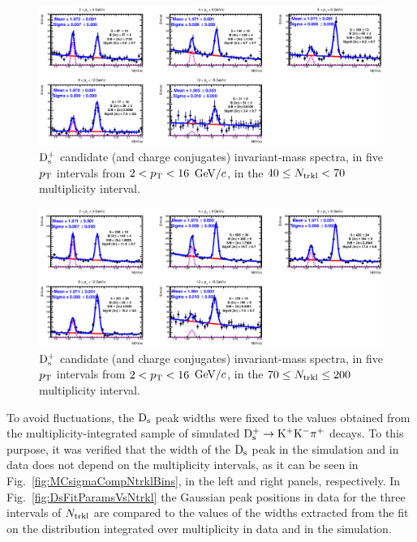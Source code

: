 \begin{figure}[htpb]
\centering
 \includegraphics[width=1\textwidth]{FigCap6/DsMass_4070Trkl.eps}
  \caption{${\rm D_s^+}$ candidate (and charge conjugates) invariant-mass spectra, in five $p_{\rm T}$ intervals from $2 < p_{\rm T} < 16$ $\mathrm{GeV}/c$, in the $40 \leq N_{\rm trkl} < 70$ multiplicity interval.}
 \label{fig:DsInvMassVsNtrkl_2}
\end{figure}
\begin{figure}[htpb]
\centering
 \includegraphics[width=1\textwidth]{FigCap6/DsMass_70200Trkl.eps}
  \caption{${\rm D_s^+}$ candidate (and charge conjugates) invariant-mass spectra, in five $p_{\rm T}$ intervals from $2 < p_{\rm T} < 16$ $\mathrm{GeV}/c$, in the $70 \leq N_{\rm trkl} \leq 200$ multiplicity interval.}
 \label{fig:DsInvMassVsNtrkl_3}
\end{figure}
To avoid fluctuations, the ${\rm D_s}$ peak widths were fixed to the values obtained from the 
multiplicity-integrated sample of simulated ${\rm D^{+}_\mathrm{s}\to K^+ K^-\pi^+}$ decays. To this purpose, it was verified that the
width of the ${\rm D_s}$ peak in the simulation and in data does not depend on the multiplicity intervals, as it can be seen in Fig.~\ref{fig:MCsigmaCompNtrklBins}, in the left and right panels, respectively. 
In Fig.~\ref{fig:DsFitParamsVsNtrkl} the Gaussian peak positions  
in data for the three intervals of $N_{\rm trkl}$ are compared to the values of the widths extracted from the fit 
on the distribution integrated over multiplicity in data and in the simulation.
